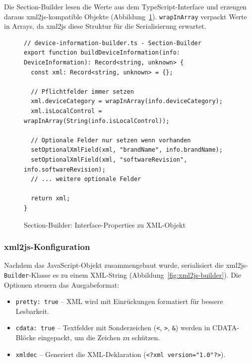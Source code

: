 \documentclass[a4paper,12pt]{article}
\newcommand{\code}[1]{\texttt{#1}}
\begin{document}
\noindent Die Section-Builder lesen die Werte aus dem TypeScript-Interface und erzeugen daraus 
xml2js-kompatible Objekte (Abbildung~\ref{fig:section-builder}). \code{wrapInArray} verpackt Werte 
in Arrays, da xml2js diese Struktur für die Serialisierung erwartet.

\begin{figure}[H]
    \centering
    \begin{lstlisting}[language=typescriptselective,frame=single,backgroundcolor=\color{gray!10},basicstyle=\ttfamily\scriptsize,breaklines=true]
// device-information-builder.ts - Section-Builder
export function buildDeviceInformation(info: DeviceInformation): Record<string, unknown> {
  const xml: Record<string, unknown> = {};

  // Pflichtfelder immer setzen
  xml.deviceCategory = wrapInArray(info.deviceCategory);
  xml.isLocalControl = wrapInArray(String(info.isLocalControl));

  // Optionale Felder nur setzen wenn vorhanden
  setOptionalXmlField(xml, "brandName", info.brandName);
  setOptionalXmlField(xml, "softwareRevision", info.softwareRevision);
  // ... weitere optionale Felder

  return xml;
}
    \end{lstlisting}
    \caption{Section-Builder: Interface-Properties zu XML-Objekt}
    \label{fig:section-builder}
\end{figure}

\subsubsection{xml2js-Konfiguration}

Nachdem das JavaScript-Objekt zusammengebaut wurde, serialisiert die xml2js-\code{Builder}-Klasse 
es zu einem XML-String (Abbildung~\ref{fig:xml2js-builder}). Die Optionen steuern das Ausgabeformat:
\begin{itemize}[noitemsep,topsep=0pt]
    \item \code{pretty: true} -- XML wird mit Einrückungen formatiert für bessere Lesbarkeit.
    \item \code{cdata: true} -- Textfelder mit Sonderzeichen (\code{<}, \code{>}, \code{\&}) werden 
          in CDATA-Blöcke eingepackt, um die Zeichen zu schützen.
    \item \code{xmldec} -- Generiert die XML-Deklaration (\code{<?xml version="1.0"?>}).
\end{itemize}
\end{document}
